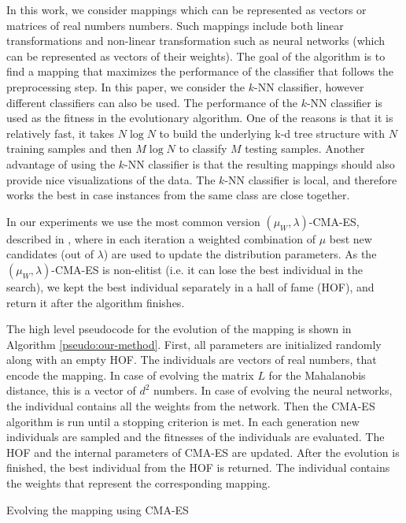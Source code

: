 In this work, we consider mappings which can be represented as vectors or matrices of real numbers numbers. Such mappings include both linear transformations and non-linear transformation such as neural networks (which can be represented as vectors of their weights). The goal of the algorithm is to find a mapping that maximizes the performance of the classifier that follows the preprocessing step. In this paper, we consider the $k$-NN classifier, however different classifiers can also be used. The performance of the $k$-NN classifier is used as the fitness in the evolutionary algorithm. One of the reasons is that it is relatively fast, it takes $N\log{N}$ to build the underlying k-d tree structure with $N$ training samples and then $M \log{N}$ to classify $M$ testing samples. Another advantage of using the $k$-NN classifier is that the resulting mappings should also provide nice visualizations of the data. The $k$-NN classifier is local, and therefore works the best in case instances from the same class are close together.

In our experiments we use the most common version $(\mu_W, \lambda)$-CMA-ES, described in \cite{hansen2001completely}, where in each iteration a weighted combination of $\mu$ best new candidates (out of $\lambda$) are used to update the distribution parameters. As the $(\mu_W, \lambda)$-CMA-ES is non-elitist (i.e. it can lose the best individual in the search), we kept the best individual separately in a hall of fame (HOF), and return it after the algorithm finishes.

The high level pseudocode for the evolution of the mapping is shown in Algorithm \ref{pseudo:our-method}. First, all parameters are initialized randomly along with an empty HOF. The individuals are vectors of real numbers, that encode the mapping. In case of evolving the matrix $L$ for the Mahalanobis distance, this is a vector of $d^2$ numbers. In case of evolving the neural networks, the individual contains all the weights from the network. Then the CMA-ES algorithm is run until a stopping criterion is met. In each generation new individuals are sampled and the fitnesses of the individuals are evaluated. The HOF and the internal parameters of CMA-ES are updated. After the evolution is finished, the best individual from the HOF is returned. The individual contains the weights that represent the corresponding mapping.

\begin{algorithm}[t]
\caption{Evolving the mapping using CMA-ES} \label{pseudo:our-method}
\DontPrintSemicolon
\LinesNumbered
{}
\end{algorithm} 

